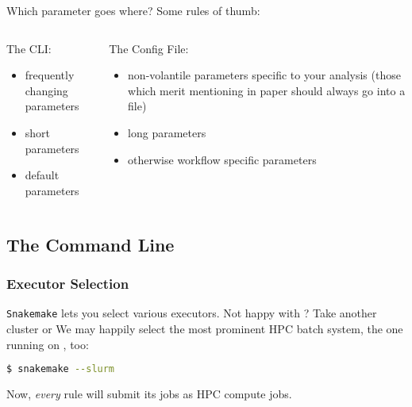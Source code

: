 \begin{frame}
  \pause
  \begin{exampleblock}{Which parameter goes where? Some rules of thumb:}
    \begin{columns}[t]
      \begin{column}{0.5\textwidth}
        The CLI:
        \begin{itemize}
         \item frequently changing parameters
         \item short parameters
         \item default parameters
        \end{itemize}
      \end{column}
      \begin{column}{0.5\textwidth}
        The Config File:
        \begin{itemize}
         \item non-volantile parameters specific to your analysis (those which merit mentioning in paper should always go into a file)
         \item long parameters
         \item otherwise workflow specific parameters
        \end{itemize}
      \end{column}
    \end{columns}
  \end{exampleblock}
\end{frame}


\subsection{The Command Line}

\begin{frame}[fragile]
  \frametitle{Executor Selection}
  \texttt{Snakemake} lets you select various executors. Not happy with \mogon? Take another cluster or  \newline
  We may happily select the most prominent HPC batch system, the one running on \mogon, too:
  \begin{lstlisting}[language=Bash, style=Shell]
$ snakemake --slurm
  \end{lstlisting}
  Now, \emph{every} rule will submit its jobs as HPC compute jobs.
\end{frame}

